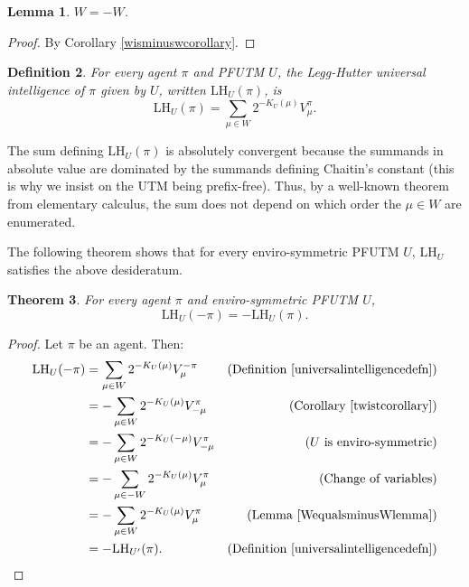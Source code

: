 \documentclass{article}
\newtheorem{theorem}{Theorem}
\newtheorem{definition}[theorem]{Definition}
\newtheorem{lemma}[theorem]{Lemma}
\def\LH{\textrm{LH}}
\begin{document}
\begin{lemma}
\label{WequalsminusWlemma}
$W=-W$.
\end{lemma}

\begin{proof}
    By Corollary \ref{wisminuswcorollary}.
\end{proof}

\begin{definition}
\label{universalintelligencedefn}
For every agent $\pi$
and PFUTM $U$, the \emph{Legg-Hutter universal intelligence of $\pi$ given
by $U$}, written $\LH_U(\pi)$, is
\[
    \LH_U(\pi) = \sum_{\mu \in W} 2^{-K_U(\mu)}V^\pi_\mu.
\]
\end{definition}

The sum defining $\LH_U(\pi)$ is absolutely convergent because the summands
in absolute value are dominated by the summands defining Chaitin's constant
(this is why we insist on the UTM being prefix-free).
Thus, by a well-known
theorem from elementary calculus, the sum does not depend on which order the $\mu\in W$
are enumerated.

The following theorem shows that for every enviro-symmetric PFUTM $U$, $\LH_U$
satisfies the above desideratum.

\begin{theorem}
\label{maintheorem}
    For every agent $\pi$ and enviro-symmetric PFUTM $U$,
    \[
        \LH_U(-\pi) = -\LH_U(\pi).
    \]
\end{theorem}

\begin{proof}
    Let $\pi$ be an agent. Then:
    \begin{align*}
        \LH_U(-\pi) &= \sum_{\mu\in W} 2^{-K_U(\mu)}V^{-\pi}_\mu
            &\mbox{(Definition \ref{universalintelligencedefn})}\\
          &= -\sum_{\mu\in W} 2^{-K_U(\mu)}V^\pi_{-\mu}
            &\mbox{(Corollary \ref{twistcorollary})}\\
          &= -\sum_{\mu\in W} 2^{-K_U(-\mu)}V^\pi_{-\mu}
            &\mbox{($U$ is enviro-symmetric)}\\
          &= -\sum_{\mu\in -W} 2^{-K_U(\mu)}V^\pi_\mu
            &\mbox{(Change of variables)}\\
          &= -\sum_{\mu\in W} 2^{-K_U(\mu)}V^\pi_\mu
            &\mbox{(Lemma \ref{WequalsminusWlemma})}\\
          &= -\LH_{U'}(\pi).
            &\mbox{(Definition \ref{universalintelligencedefn})}
    \end{align*}
\end{proof}
\end{document}
